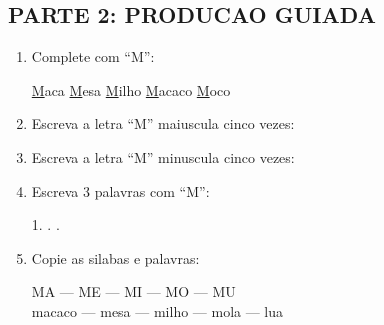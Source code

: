 \begin{exercicio}
\subsection*{PARTE 2: PRODUCAO GUIADA}

\begin{enumerate}[resume]
  \item Complete com ``M'':
  \begin{center}
  \underline{M}aca \quad \underline{M}esa \quad \underline{M}ilho \quad \underline{M}acaco \quad \underline{M}oco
  \end{center}

  \item Escreva a letra ``M'' maiuscula cinco vezes:
  \begin{center}
  \underline{\hspace{1.5cm}} \quad \underline{\hspace{1.5cm}} \quad \underline{\hspace{1.5cm}} \quad \underline{\hspace{1.5cm}} \quad \underline{\hspace{1.5cm}}
  \end{center}

  \item Escreva a letra ``M'' minuscula cinco vezes:
  \begin{center}
  \underline{\hspace{1.5cm}} \quad \underline{\hspace{1.5cm}} \quad \underline{\hspace{1.5cm}} \quad \underline{\hspace{1.5cm}} \quad \underline{\hspace{1.5cm}}
  \end{center}

  \item Escreva 3 palavras com ``M'':
  \begin{center}
  1. \underline{\hspace{4cm}} . \underline{\hspace{4cm}} . \underline{\hspace{4cm}}
  \end{center}

  \item Copie as silabas e palavras:
  \begin{center}
  MA --- ME --- MI --- MO --- MU\\
  macaco --- mesa --- milho --- mola --- lua
  \end{center}
\end{enumerate}


\end{exercicio}
